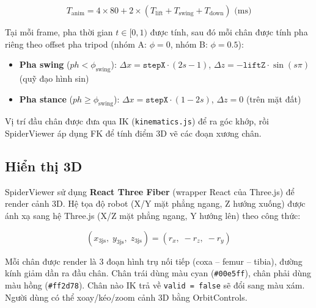         \begin{equation}
            T_\mathrm{anim} = 4 \times 80 + 2 \times (T_\mathrm{lift} + T_\mathrm{swing} + T_\mathrm{down}) \text{ (ms)}
        \end{equation}

        Tại mỗi frame, pha thời gian $t \in [0, 1)$ được tính, sau đó mỗi chân được tính pha riêng theo offset pha tripod (nhóm A: $\phi = 0$, nhóm B: $\phi = 0.5$):

        \begin{itemize}
            \item \textbf{Pha swing} ($ph < \phi_\mathrm{swing}$): $\Delta x = \mathtt{stepX} \cdot (2s - 1)$, $\Delta z = -\mathtt{liftZ} \cdot \sin(s\pi)$ (quỹ đạo hình sin)
            \item \textbf{Pha stance} ($ph \geq \phi_\mathrm{swing}$): $\Delta x = \mathtt{stepX} \cdot (1 - 2s)$, $\Delta z = 0$ (trên mặt đất)
        \end{itemize}

        Vị trí đầu chân được đưa qua IK (\texttt{kinematics.js}) để ra góc khớp, rồi SpiderViewer áp dụng FK để tính điểm 3D vẽ các đoạn xương chân.

        \subsection{Hiển thị 3D}

        \hspace{0.5cm} SpiderViewer sử dụng \textbf{React Three Fiber} (wrapper React của Three.js) để render cảnh 3D. Hệ tọa độ robot (X/Y mặt phẳng ngang, Z hướng xuống) được ánh xạ sang hệ Three.js (X/Z mặt phẳng ngang, Y hướng lên) theo công thức:

        \begin{equation}
            (x_\mathrm{3js},\; y_\mathrm{3js},\; z_\mathrm{3js}) = (r_x,\; -r_z,\; -r_y)
        \end{equation}

        Mỗi chân được render là 3 đoạn hình trụ nối tiếp (coxa -- femur -- tibia), đường kính giảm dần ra đầu chân. Chân trái dùng màu cyan (\texttt{\#00e5ff}), chân phải dùng màu hồng (\texttt{\#ff2d78}). Chân nào IK trả về \texttt{valid = false} sẽ đổi sang màu xám. Người dùng có thể xoay/kéo/zoom cảnh 3D bằng OrbitControls.